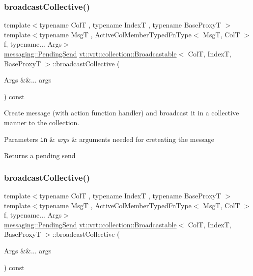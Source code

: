\subsubsection{\texorpdfstring{broadcast\+Collective()}{broadcastCollective()}\hspace{0.1cm}{\footnotesize\ttfamily [1/2]}}
{\footnotesize\ttfamily template$<$typename ColT , typename IndexT , typename Base\+ProxyT $>$ \\
template$<$typename MsgT , Active\+Col\+Member\+Typed\+Fn\+Type$<$ Msg\+T, Col\+T $>$ f, typename... Args$>$ \\
\hyperlink{structvt_1_1messaging_1_1_pending_send}{messaging\+::\+Pending\+Send} \hyperlink{structvt_1_1vrt_1_1collection_1_1_broadcastable}{vt\+::vrt\+::collection\+::\+Broadcastable}$<$ ColT, IndexT, Base\+ProxyT $>$\+::broadcast\+Collective (\begin{DoxyParamCaption}\item[{Args \&\&...}]{args }\end{DoxyParamCaption}) const}



Create message (with action function handler) and broadcast it in a collective manner to the collection. 


\begin{DoxyParams}[1]{Parameters}
\mbox{\tt in}  & {\em args} & arguments needed for creteating the message\\
\hline
\end{DoxyParams}
\begin{DoxyReturn}{Returns}
a pending send 
\end{DoxyReturn}
\mbox{\label{structvt_1_1vrt_1_1collection_1_1_broadcastable_acef03dd57082f32556bef0e536a07fe9}} 
\subsubsection{\texorpdfstring{broadcast\+Collective()}{broadcastCollective()}\hspace{0.1cm}{\footnotesize\ttfamily [2/2]}}
{\footnotesize\ttfamily template$<$typename ColT , typename IndexT , typename Base\+ProxyT $>$ \\
template$<$typename MsgT , Active\+Col\+Member\+Typed\+Fn\+Type$<$ Msg\+T, Col\+T $>$ f, typename... Args$>$ \\
\hyperlink{structvt_1_1messaging_1_1_pending_send}{messaging\+::\+Pending\+Send} \hyperlink{structvt_1_1vrt_1_1collection_1_1_broadcastable}{vt\+::vrt\+::collection\+::\+Broadcastable}$<$ ColT, IndexT, Base\+ProxyT $>$\+::broadcast\+Collective (\begin{DoxyParamCaption}\item[{Args \&\&...}]{args }\end{DoxyParamCaption}) const}



